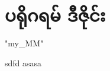 \chapter{ ပရိုဂရမ် ဒီဇိုင်း}
\XeTeXlinebreaklocale "my_MM"  %
\begin{sloppypar}


    sdfd
  asasa

\end{sloppypar}

